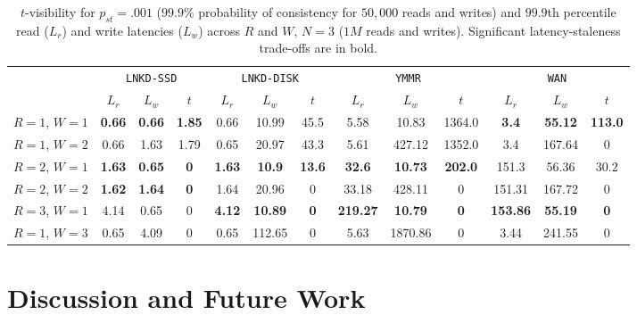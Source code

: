 \documentclass{vldb}
\newcommand{\sectionskip}{-0em}
\begin{document}
\begin{table}
\centering
\begin{tabular}{c|c|c|c|c|c|c|c|c|c|c|c|c|}
\cline{2-13}
 & \multicolumn{3}{|c|}{\texttt{LNKD-SSD}} & \multicolumn{3}{|c|}{\texttt{LNKD-DISK}} & \multicolumn{3}{|c|}{\texttt{YMMR}} & \multicolumn{3}{|c|}{\texttt{WAN}}\\
&\multicolumn{1}{|c}{$L_r$}  & \multicolumn{1}{c}{$L_w$} & \multicolumn{1}{c|}{$t$} &  \multicolumn{1}{|c}{$L_r$} & \multicolumn{1}{c}{$L_w$} & \multicolumn{1}{c|}{$t$} &  \multicolumn{1}{|c}{$L_r$} & \multicolumn{1}{c}{$L_w$} & \multicolumn{1}{c|}{$t$} &  \multicolumn{1}{|c}{$L_r$} & \multicolumn{1}{c}{$L_w$} & \multicolumn{1}{c|}{$t$} \\\hline
\multicolumn{1}{|c|}{$R$$=$$1$, $W$$=$$1$}
&  \textbf{0.66} & \textbf{0.66} & \textbf{1.85} & 0.66 & 10.99 & 45.5 & 5.58 & 10.83 & 1364.0 & \textbf{3.4} & \textbf{55.12} & \textbf{113.0} \\
\multicolumn{1}{|c|}{$R$$=$$1$, $W$$=$$2$}
&  0.66 & 1.63 & 1.79 & 0.65 & 20.97 & 43.3 & 5.61 & 427.12 & 1352.0 & 3.4 & 167.64 & 0 \\
\multicolumn{1}{|c|}{$R$$=$$2$, $W$$=$$1$}
& \textbf{1.63} & \textbf{0.65} & \textbf{0} & \textbf{1.63} & \textbf{10.9} & \textbf{13.6}& \textbf{32.6} & \textbf{10.73} & \textbf{202.0} & 151.3 & 56.36 & 30.2 \\
\multicolumn{1}{|c|}{$R$$=$$2$, $W$$=$$2$}
&  \textbf{1.62} & \textbf{1.64} & \textbf{0} & 1.64 & 20.96 & 0& 33.18 & 428.11 & 0 & 151.31 & 167.72 & 0 \\
\multicolumn{1}{|c|}{$R$$=$$3$, $W$$=$$1$}
&  4.14 & 0.65 & 0 & \textbf{4.12} & \textbf{10.89} & \textbf{0} & \textbf{219.27} & \textbf{10.79} & \textbf{0} & \textbf{153.86} & \textbf{55.19} & \textbf{0} \\
\multicolumn{1}{|c|}{$R$$=$$1$, $W$$=$$3$}
& 0.65 & 4.09 & 0 & 0.65 & 112.65 & 0& 5.63 & 1870.86 & 0 & 3.44 & 241.55 & 0 \\
\hline
\end{tabular}
\vspace{-4pt}
\caption{$t$-visibility for $p_{st} = .001$ ($99.9\%$ probability
  of consistency for $50,000$ reads and writes) and $99.9$th percentile read
  ($L_r$) and write latencies ($L_w$) across $R$ and $W$, $N$$=$$3$
  ($1M$ reads and writes). Significant latency-staleness trade-offs are in bold.}
\vspace{-12pt}
\label{table:lat-stale}
\end{table}

\vspace{\sectionskip}\section{Discussion and Future Work}
\label{sec:discussion}
\end{document}
